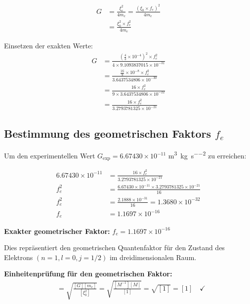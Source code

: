 \documentclass[12pt,a4paper]{article}
\theoremstyle{definition}
\begin{document}
	\begin{align}
		G &= \frac{\xi_e^2}{4m_e} = \frac{(\xi_0 \times f_e)^2}{4m_e}\\
		&= \frac{\xi_0^2 \times f_e^2}{4m_e}
	\end{align}
	
	Einsetzen der exakten Werte:
	\begin{align}
		G &= \frac{\left(\frac{4}{3} \times 10^{-4}\right)^2 \times f_e^2}{4 \times 9.1093837015 \times 10^{-31}}\\
		&= \frac{\frac{16}{9} \times 10^{-8} \times f_e^2}{3.6437534806 \times 10^{-30}}\\
		&= \frac{16 \times f_e^2}{9 \times 3.6437534806 \times 10^{-22}}\\
		&= \frac{16 \times f_e^2}{3.2793781325 \times 10^{-21}}
	\end{align}
	
	\subsection{Bestimmung des geometrischen Faktors $f_e$}
	
	Um den experimentellen Wert $G_{\text{exp}} = 6.67430 \times 10^{-11}$ \si{\metre\cubed\per\kilogram\per\second\squared} zu erreichen:
	
	\begin{align}
		6.67430 \times 10^{-11} &= \frac{16 \times f_e^2}{3.2793781325 \times 10^{-21}}\\
		f_e^2 &= \frac{6.67430 \times 10^{-11} \times 3.2793781325 \times 10^{-21}}{16}\\
		f_e^2 &= \frac{2.1888 \times 10^{-31}}{16} = 1.3680 \times 10^{-32}\\
		f_e &= 1.1697 \times 10^{-16}
	\end{align}
	
	\begin{important}
		\textbf{Exakter geometrischer Faktor:} $f_e = 1.1697 \times 10^{-16}$
		
		Dies repräsentiert den geometrischen Quantenfaktor für den Zustand des Elektrons $(n=1, l=0, j=1/2)$ im dreidimensionalen Raum.
	\end{important}
	
	\textbf{Einheitenprüfung für den geometrischen Faktor:}
	\begin{align}
		[f_e] &= \sqrt{\frac{[G][m_e]}{[\xi_0^2]}} = \sqrt{\frac{[M^{-1}][M]}{[1]}} = \sqrt{[1]} = [1] \quad \checkmark
	\end{align}
	
\end{document}

